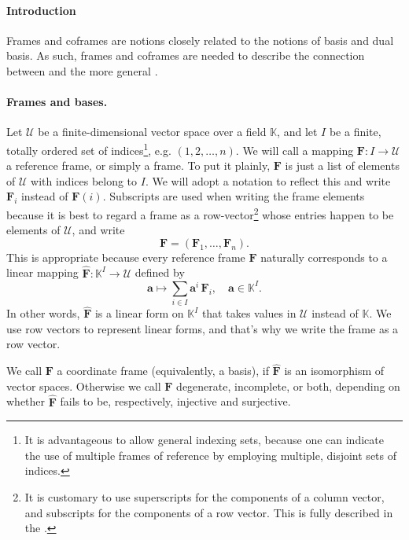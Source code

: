 \documentclass[12pt]{article}
\newcommand{\cU}{\mathcal{U}}
\newcommand{\bF}{\mathbf{F}}
\newcommand{\hbF}{\hat{\bF}}
\newcommand{\ba}{\mathbf{a}}
\newcommand{\kfield}{\mathbb{K}}
\begin{document}
\paragraph{Introduction}
Frames and coframes are notions closely related to the notions of
basis and dual basis.  As such, frames and coframes are needed to
describe the connection between  and
the more general .  


\paragraph{Frames and bases.}
Let $\cU$ be a finite-dimensional vector space over a field $\kfield$,
and let $I$ be a finite, totally ordered set of indices\footnote{It is
  advantageous to allow general indexing sets, because one can
  indicate the use of multiple frames of reference by employing
  multiple, disjoint sets of indices.}, e.g.  $(1,2,\ldots,n)$.  We
will call a mapping $\bF:I\rightarrow\cU$ a reference frame, or simply
a frame.  To put it plainly, $\bF$ is just a list of elements of $\cU$
with indices belong to $I$.  We will adopt a notation to reflect this
and write $\bF_i$ instead of $\bF(i)$.  Subscripts are used when
writing the frame elements because it is best to regard a frame as a
row-vector\footnote{It is customary to use superscripts for the
  components of a column vector, and subscripts for the components of
  a row vector.  This is fully described in the
.}  whose entries happen to be elements of $\cU$,
and write
$$\bF = (\bF_1,\ldots,\bF_n).$$
This is appropriate because
every reference frame $\bF$ naturally corresponds to a linear
mapping $\hbF:\kfield^I\rightarrow \cU$ defined by
$$
\ba \mapsto \sum_{i\in I} \ba^i\, \bF_i,\quad \ba\in \kfield^I.$$
In other words, $\hbF$ is a linear form on $\kfield^I$ that takes
values in $\cU$ instead of $\kfield$.  We use row vectors to represent
linear forms, and that's why we write the frame as a row vector.

We call $\bF$ a coordinate frame (equivalently, a basis), if $\hbF$ is
an isomorphism of vector spaces.  Otherwise we call $\bF$ degenerate,
incomplete, or both, depending on whether $\hbF$ fails to be,
respectively, injective and surjective.
\end{document}
